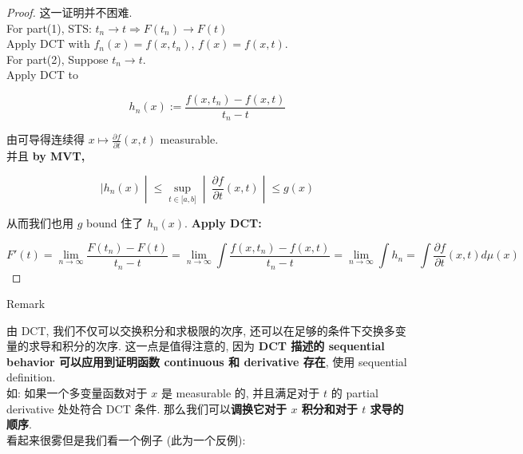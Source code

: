 \documentclass{qlnotes-export}
\begin{document}
\begin{proof}

这一证明并不困难.\\
For part(1), STS: \(t_{n}\rightarrow t\Longrightarrow F(t_{n})\rightarrow F(t)\)\\
Apply DCT with \(f_{n}(x) = f(x,t_{n})\), \(f(x) = f(x,t)\).\\
For part(2), Suppose \(t_{n}\rightarrow t\).\\
Apply DCT to

\[h_{n}(x) := \frac{f(x,t_{n}) - f(x,t)}{t_{n} - t}\]

由可导得连续得 \(x\mapsto\frac{\partial f}{\partial t}(x,t)\) measurable.\\
并且 \textbf{by MVT,}

\[\left. |h_{n}(x) \middle| \leq \sup\limits_{t \in \lbrack a,b\rbrack} \middle| \ \frac{\partial f}{\partial t}(x,t) \middle| \leq g(x) \right.\]

从而我们也用 \(g\) bound 住了 \(h_{n}(x)\). \textbf{Apply DCT:}

\[F'(t) = \lim\limits_{n\rightarrow\infty}\frac{F(t_{n}) - F(t)}{t_{n} - t} = \lim\limits_{n\rightarrow\infty}\int\frac{f(x,t_{n}) - f(x,t)}{t_{n} - t} = \lim\limits_{n\rightarrow\infty}\int h_{n} = \int\frac{\partial f}{\partial t}(x,t) d\mu(x)\]

\end{proof}

\begin{qlremark}{Remark}

由 DCT, 我们不仅可以交换积分和求极限的次序, 还可以在足够的条件下交换多变量的求导和积分的次序. 这一点是值得注意的, 因为 \textbf{DCT 描述的 sequential behavior 可以应用到证明函数 continuous 和 derivative 存在}, 使用 sequential definition.\\
如: 如果一个多变量函数对于 \(x\) 是 measurable 的, 并且满足对于 \(t\) 的 partial derivative 处处符合 DCT 条件. 那么我们可以\textbf{调换它对于 \(x\) 积分和对于 \(t\) 求导的顺序}.\\
看起来很雾但是我们看一个例子 (此为一个反例):

\end{qlremark}
\end{document}
